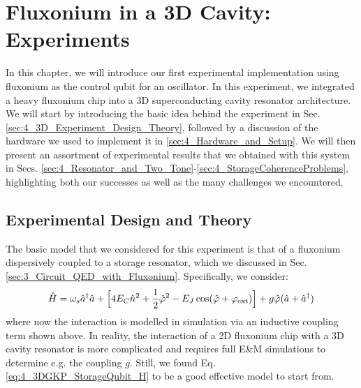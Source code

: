 \chapter{Fluxonium in a 3D Cavity: Experiments\label{ch:4_3DGKP}}
In this chapter, we will introduce our first experimental implementation using fluxonium as the control qubit for an oscillator. In this experiment, we integrated a heavy fluxonium chip into a 3D superconducting cavity resonator architecture. We will start by introducing the basic idea behind the experiment in Sec. \ref{sec:4_3D_Experiment_Design_Theory}, followed by a discussion of the hardware we used to implement it in \ref{sec:4_Hardware_and_Setup}. We will then present an assortment of experimental results that we obtained with this system in Secs. \ref{sec:4_Resonator_and_Two_Tone}-\ref{sec:4_StorageCoherenceProblems}, highlighting both our successes as well as the many challenges we encountered.  
\section{Experimental Design and Theory \label{sec:4_3D_Experiment_Design_Theory}}
The basic model that we considered for this experiment is that of a fluxonium dispersively coupled to a storage resonator, which we discussed in Sec. \ref{sec:3_Circuit_QED_with_Fluxonium}. Specifically, we consider: 
\begin{equation}
    \hat{H} = \omega_s \hat{a}^\dagger \hat{a} + \Big[4E_C \hat{n}^2 + \frac{1}{2}\hat{\varphi}^2 - E_J\cos(\hat{\varphi}+\varphi_{\rm ext})\Big] + g\hat{\varphi}(\hat{a} + \hat{a}^\dagger)
    \label{eq:4_3DGKP_StorageQubit_H}
\end{equation}
where now the interaction is modelled in simulation via an inductive coupling term shown above. In reality, the interaction of a 2D fluxonium chip with a 3D cavity resonator is more complicated and requires full E\&M simulations to determine e.g. the coupling $g$. Still, we found Eq. \eqref{eq:4_3DGKP_StorageQubit_H} to be a good effective model to start from. 

